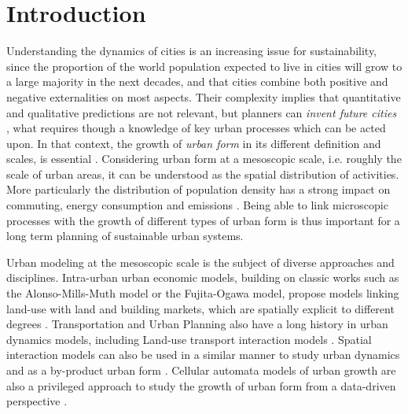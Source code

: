\documentclass[10pt,letterpaper]{article}
\begin{document}
\section*{Introduction}


Understanding the dynamics of cities is an increasing issue for sustainability, since the proportion of the world population expected to live in cities will grow to a large majority in the next decades, and that cities combine both positive and negative externalities on most aspects. Their complexity implies that quantitative and qualitative predictions are not relevant, but planners can \emph{invent future cities} \cite{batty2018inventing}, what requires though a knowledge of key urban processes which can be acted upon. In that context, the growth of \emph{urban form} in its different definition and scales, is essential \cite{williams2000achieving}. Considering urban form at a mesoscopic scale, i.e. roughly the scale of urban areas, it can be understood as the spatial distribution of activities. More particularly the distribution of population density has a strong impact on commuting, energy consumption and emissions \cite{le2012urban}. Being able to link microscopic processes with the growth of different types of urban form is thus important for a long term planning of sustainable urban systems.


Urban modeling at the mesoscopic scale is the subject of diverse approaches and disciplines. Intra-urban urban economic models, building on classic works such as the Alonso-Mills-Muth model or the Fujita-Ogawa model, propose models linking land-use with land and building markets, which are spatially explicit to different degrees \cite{viguie2012trade}. Transportation and Urban Planning also have a long history in urban dynamics models, including Land-use transport interaction models \cite{wegener2004land}. Spatial interaction models can also be used in a similar manner to study urban dynamics and as a by-product urban form \cite{milton2019accelerating}. Cellular automata models of urban growth are also a privileged approach to study the growth of urban form from a data-driven perspective \cite{batty1997cellular}.
\end{document}
